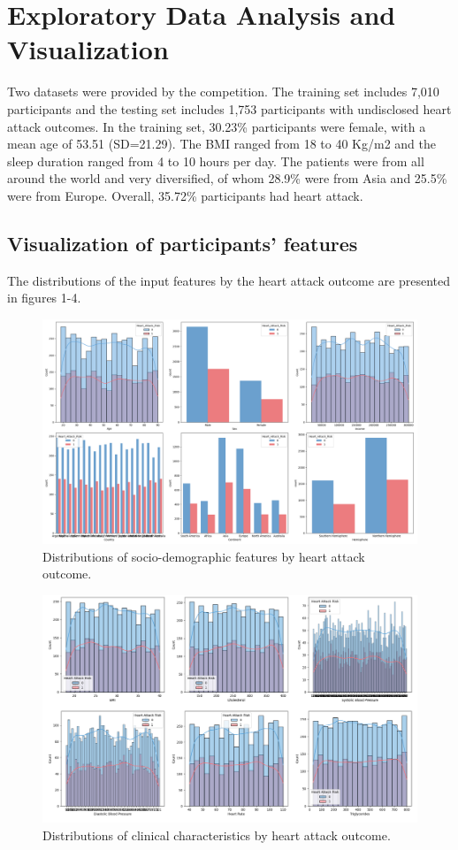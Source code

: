 \documentclass{article}
\begin{document}
\section{Exploratory Data Analysis and Visualization}
Two datasets were provided by the competition. The training set includes 7,010 participants and the testing set includes 1,753 participants with undisclosed heart attack outcomes. In the training set, 30.23\% participants were female, with a mean age of 53.51 (SD=21.29). The BMI ranged from 18 to 40 Kg/m2 and the sleep duration ranged from 4 to 10 hours per day. The patients were from all around the world and very diversified, of whom 28.9\% were from Asia and 25.5\% were from Europe. Overall, 35.72\% participants had heart attack. 

\subsection{Visualization of participants' features}
The distributions of the input features by the heart attack outcome are presented in figures 1-4.

\begin{figure}
\centering
\includegraphics[width=1\linewidth]{figures/socio_demographics.png}
\caption{\label{fig:socio_demographics} Distributions of socio-demographic features by heart attack outcome.}
\end{figure}

\begin{figure}
\centering
\includegraphics[width=1\linewidth]{figures/clinical_characteristics.png}
\caption{\label{fig:clinical_characteristics} Distributions of clinical characteristics by heart attack outcome.}
\end{figure}
\end{document}
